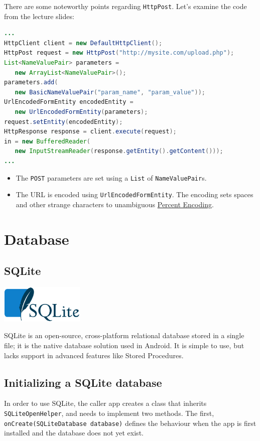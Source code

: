\documentclass{article}
\def\cw#1{\texttt{#1}}
\begin{document}
There are some noteworthy points regarding \cw{HttpPost}. Let's examine the code from the lecture slides:

\begin{code} \begin{lstlisting}[language=Java]
...
HttpClient client = new DefaultHttpClient();
HttpPost request = new HttpPost("http://mysite.com/upload.php");
List<NameValuePair> parameters =
   new ArrayList<NameValuePair>();
parameters.add(
   new BasicNameValuePair("param_name", "param_value"));
UrlEncodedFormEntity encodedEntity =
   new UrlEncodedFormEntity(parameters);
request.setEntity(encodedEntity);
HttpResponse response = client.execute(request);
in = new BufferedReader(
   new InputStreamReader(response.getEntity().getContent()));
...
\end{lstlisting} \end{code}

\begin{itemize}
\item{The \cw{POST} parameters are set using a \cw{List} of \cw{NameValuePair}s. }
\item{The URL is encoded using \cw{UrlEncodedFormEntity}. The encoding sets spaces and other strange characters to unambiguous  \href{http://en.wikipedia.org/wiki/Percent-encoding}{Percent Encoding}. }
\end{itemize}

\section{Database}
\subsection{SQLite}

\begin{center}
\includegraphics[width=0.3\textwidth]{img/sqlite_logo_wikipedia.eps}
\end{center}

SQLite is an open-source, cross-platform relational database stored in a single file; it is the native database solution used in Android. It is simple to use, but lacks support in advanced features like Stored Procedures.

\subsection{Initializing a SQLite database}
 In order to use SQLite, the caller app creates a class that inherits \cw{SQLiteOpenHelper}, and needs to implement two methods. The first, \cw{onCreate(SQLiteDatabase database)} defines the behaviour when the app is first installed and the database does not yet exist. 
\end{document}
